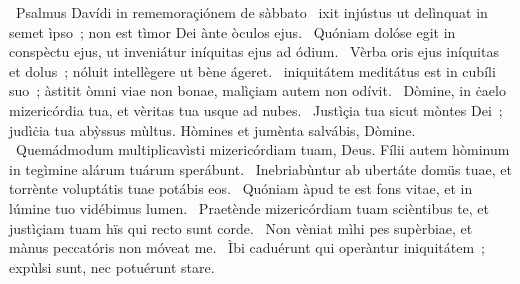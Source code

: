 {~Psalmus Davídi in rememoraçiónem de sàbbato}
{%
~ixit injústus ut delìnquat in semet ìpso~; non est tìmor Dei ànte òculos ejus.
~Quóniam dolóse egit in conspèctu ejus, ut inveniátur iníquitas ejus ad ódium.
~Vèrba oris ejus iníquitas et dolus~; nóluit intellègere ut bène ágeret.
~iniquitátem meditátus est in cubíli suo~; àstitit òmni viae non bonae, malìçiam autem non odívit.
~Dòmine, in ċaelo mizericórdia tua, et vèritas tua usque ad nubes.
~Justìçia tua sicut mòntes Dei~; judìċia tua abỳssus mùltus. Hòmines et jumènta salvábis, Dòmine.
~Quemádmodum multiplicavìsti mizericórdiam tuam, Deus. Fílii autem hòminum in tegìmine alárum tuárum sperábunt.
~Inebriabùntur ab ubertáte domüs tuae, et torrènte voluptátis tuae potábis eos.
~Quóniam àpud te est fons vitae, et in lúmine tuo vidébimus lumen.
~Praetènde mizericórdiam tuam scièntibus te, et justìçiam tuam hïs qui recto sunt corde.
~Non vèniat mìhi pes supèrbiae, et mànus peccatóris non móveat me.
~Ìbi caduérunt qui operàntur iniquitátem~; expùlsi sunt, nec potuérunt stare.}
